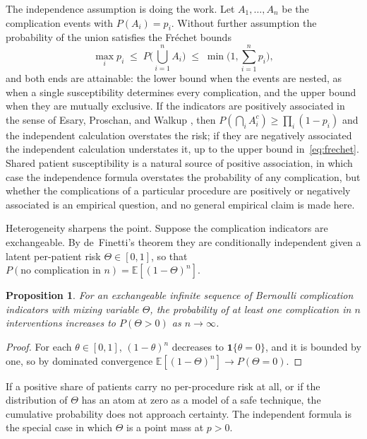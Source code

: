 \documentclass[11pt]{article}
\theoremstyle{plain}
\newtheorem{proposition}{Proposition}
\theoremstyle{definition}
\theoremstyle{remark}
\newcommand{\E}{\mathbb{E}}
\newcommand{\Ind}{\mathbf{1}}
\begin{document}
The independence assumption is doing the work. Let $A_1,\dots,A_n$ be the complication events with $P(A_i)=p_i$. Without further assumption the probability of the union satisfies the Fr\'echet bounds
\begin{equation}\label{eq:frechet}
\max_i p_i\;\le\;P\Big(\bigcup_{i=1}^nA_i\Big)\;\le\;\min\Big(1,\sum_{i=1}^np_i\Big),
\end{equation}
and both ends are attainable: the lower bound when the events are nested, as when a single susceptibility determines every complication, and the upper bound when they are mutually exclusive. If the indicators are positively associated in the sense of Esary, Proschan, and Walkup \cite{esary1967}, then $P(\bigcap_i A_i^c)\ge\prod_i(1-p_i)$ and the independent calculation overstates the risk; if they are negatively associated the independent calculation understates it, up to the upper bound in~\eqref{eq:frechet}. Shared patient susceptibility is a natural source of positive association, in which case the independence formula overstates the probability of any complication, but whether the complications of a particular procedure are positively or negatively associated is an empirical question, and no general empirical claim is made here.

Heterogeneity sharpens the point. Suppose the complication indicators are exchangeable. By de~Finetti's theorem \cite{definetti1937} they are conditionally independent given a latent per-patient risk $\Theta\in[0,1]$, so that $P(\text{no complication in }n)=\E[(1-\Theta)^n]$.

\begin{proposition}\label{prop:exch}
For an exchangeable infinite sequence of Bernoulli complication indicators with mixing variable $\Theta$, the probability of at least one complication in $n$ interventions increases to $P(\Theta>0)$ as $n\to\infty$.
\end{proposition}

\begin{proof}
For each $\theta\in[0,1]$, $(1-\theta)^n$ decreases to $\Ind\{\theta=0\}$, and it is bounded by one, so by dominated convergence $\E[(1-\Theta)^n]\to P(\Theta=0)$.
\end{proof}

If a positive share of patients carry no per-procedure risk at all, or if the distribution of $\Theta$ has an atom at zero as a model of a safe technique, the cumulative probability does not approach certainty. The independent formula is the special case in which $\Theta$ is a point mass at $p>0$.
\end{document}
